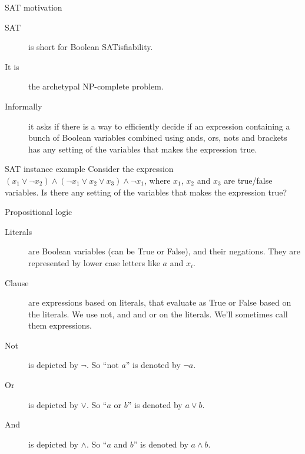 \begin{frame}{SAT motivation}
  \begin{description}
    \item[SAT] is short for Boolean SATisfiability.
    \item[It is] the archetypal NP-complete problem.
    \item[Informally] it asks if there is a way to efficiently decide if an expression containing a bunch of Boolean variables combined using ands, ors, nots and brackets has any setting of the variables that makes the expression true.
  \end{description}

  \begin{exampleblock}{SAT instance example}
    Consider the expression $(x_1 \lor \neg{x_2}) \land (\neg{x_1} \lor x_2 \lor x_3) \land \neg{x_1}$, where $x_1$, $x_2$ and $x_3$ are true/false variables.
    Is there any setting of the variables that makes the expression true?
  \end{exampleblock}
\end{frame}


\begin{frame}{Propositional logic}
  \begin{description}
    \item[Literals] are Boolean variables (can be True or False), and their negations. They are represented by lower case letters like $a$ and $x_i$.
    \vspace{0.3cm}
    \item[Clause] are expressions based on literals, that evaluate as True or False based on the literals. We use not, and and or on the literals. We'll sometimes call them expressions.
    \vspace{0.3cm}
    \item[Not] is depicted by $\neg$. So ``not $a$'' is denoted by $\neg a$.
    \vspace{0.3cm}
    \item[Or] is depicted by $\lor$. So ``$a$ or $b$'' is denoted by $a \lor b$.
    \vspace{0.3cm}
    \item[And] is depicted by $\land$. So ``$a$ and $b$'' is denoted by $a \land b$.
  \end{description}
\end{frame}


